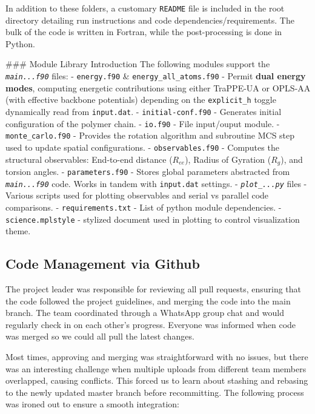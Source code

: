 \documentclass[
]{article}
\begin{document}
In addition to these folders, a customary \texttt{README} file is
included in the root directory detailing run instructions and code
dependencies/requirements. The bulk of the code is written in Fortran,
while the post-processing is done in Python.

\#\#\# Module Library Introduction The following modules support the
\emph{\texttt{main...f90}} files: - \texttt{energy.f90} \&
\texttt{energy\_all\_atoms.f90} - Permit \textbf{dual energy modes},
computing energetic contributions using either TraPPE-UA or OPLS-AA
(with effective backbone potentials) depending on the
\texttt{explicit\_h} toggle dynamically read from \texttt{input.dat}. -
\texttt{initial-conf.f90} - Generates initial configuration of the
polymer chain. - \texttt{io.f90} - File input/ouput module. -
\texttt{monte\_carlo.f90} - Provides the rotation algorithm and
subroutine MCS step used to update spatial configurations. -
\texttt{observables.f90} - Computes the structural observables:
End-to-end distance (\(R_{ee}\)), Radius of Gyration (\(R_g\)), and
torsion angles. - \texttt{parameters.f90} - Stores global parameters
abstracted from \emph{\texttt{main...f90}} code. Works in tandem with
\texttt{input.dat} settings. - \emph{\texttt{plot\_...py}} files -
Various scripts used for plotting observables and serial vs parallel
code comparisons. - \texttt{requirements.txt} - List of python module
dependencies. - \texttt{science.mplstyle} - stylized document used in
plotting to control visualization theme.

\subsection{Code Management via
Github}\label{code-management-via-github}

The project leader was responsible for reviewing all pull requests,
ensuring that the code followed the project guidelines, and merging the
code into the main branch. The team coordinated through a WhatsApp group
chat and would regularly check in on each other's progress. Everyone was
informed when code was merged so we could all pull the latest changes.

Most times, approving and merging was straightforward with no issues,
but there was an interesting challenge when multiple uploads from
different team members overlapped, causing conflicts. This forced us to
learn about stashing and rebasing to the newly updated master branch
before recommitting. The following process was ironed out to ensure a
smooth integration:
\end{document}
